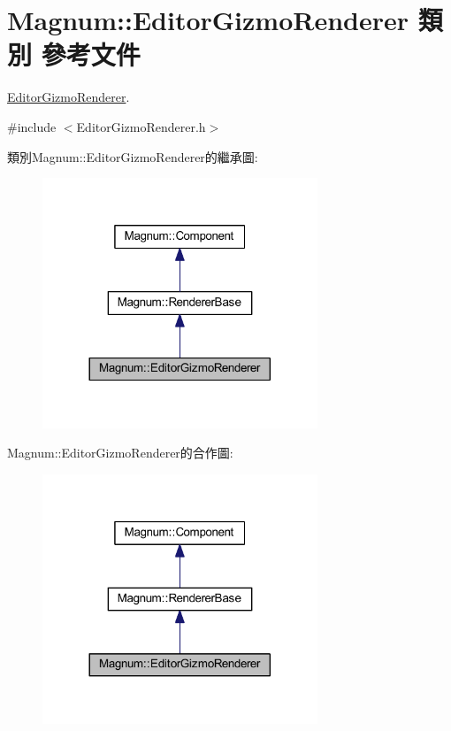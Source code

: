 \hypertarget{class_magnum_1_1_editor_gizmo_renderer}{}\section{Magnum\+:\+:Editor\+Gizmo\+Renderer 類別 參考文件}
\label{class_magnum_1_1_editor_gizmo_renderer}


\hyperlink{class_magnum_1_1_editor_gizmo_renderer}{Editor\+Gizmo\+Renderer}.  




{\ttfamily \#include $<$Editor\+Gizmo\+Renderer.\+h$>$}



類別\+Magnum\+:\+:Editor\+Gizmo\+Renderer的繼承圖\+:\nopagebreak
\begin{figure}[H]
\begin{center}
\leavevmode
\includegraphics[width=233pt]{class_magnum_1_1_editor_gizmo_renderer__inherit__graph}
\end{center}
\end{figure}


Magnum\+:\+:Editor\+Gizmo\+Renderer的合作圖\+:\nopagebreak
\begin{figure}[H]
\begin{center}
\leavevmode
\includegraphics[width=233pt]{class_magnum_1_1_editor_gizmo_renderer__coll__graph}
\end{center}
\end{figure}
